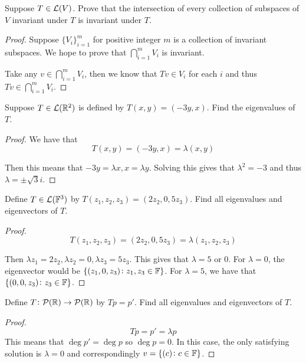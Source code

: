 \documentclass{extarticle}
\begin{document}
\begin{problem}{3}
    Suppose \(T \in \mathcal{L}(V)\). Prove that the intersection of every collection of 
    subspaces of \(V\) invariant under \(T\) is invariant under \(T\).
\end{problem}

\begin{proof}
Suppose \(\{V_i\}_{i=1}^m\) for positive integer \(m\) is a collection of invariant subspaces. 
We hope to prove that \(\bigcap_{i=1}^m V_i\) is invariant. 

Take any \(v \in \bigcap_{i=1}^m V_i\), then we know that \(Tv \in V_i\) for each \(i\)
and thus \(Tv \in \bigcap_{i=1}^m V_i\).
\end{proof}

\begin{problem}{5}
    Suppose \(T \in \mathcal{L}(\mathbb{R}^2)\) is defined by \(T(x, y) = (-3y, x)\). Find the eigenvalues 
    of \(T\).
\end{problem}

\begin{proof}
We have that 
\[T(x, y) = (-3 y, x) = \lambda(x, y)\]

Then this means that \(-3y = \lambda x, x= \lambda y\). Solving this gives that \(\lambda^2 = -3\)
and thus \(\lambda = \pm \sqrt{3}i\). 
\end{proof}

\begin{problem}{7}
    Define \(T \in \mathcal{L}(\mathbb{F}^3)\) by \(T(z_1, z_2, z_3) = (2z_2, 0, 5z_3)\). Find all eigenvalues 
    and eigenvectors of \(T\).
\end{problem}

\begin{proof}
\[T(z_1, z_2, z_3) = (2z_2, 0, 5z_3) = \lambda(z_1, z_2, z_3)\]

Then \(\lambda z_1 = 2z_2, \lambda z_2 = 0, \lambda z_3 = 5 z_3\). This gives that \(\lambda=5 \text{ or } 0\).
For \(\lambda = 0\), the eigenvector would be \(\{(z_1, 0, z_3) \colon z_1, z_3 \in \mathbb{F}\}\). 
For \(\lambda = 5\), we have that \(\{(0, 0, z_3) \colon z_3 \in \mathbb{F}\}\). 
\end{proof}

\begin{problem}{9}
    Define \(T \colon \mathcal{P}(\mathbb{R}) \to \mathcal{P}(\mathbb{R})\) by \(Tp = p'\). Find all eigenvalues and 
    eigenvectors of \(T\).
\end{problem}

\begin{proof}
\[Tp = p' = \lambda p\]
This means that \(\deg p' = \deg p\) so \(\deg p = 0\). In this case, the only satisfying 
solution is \(\lambda = 0\) and correspondingly \(v = \{(c) \colon c \in \mathbb{F}\}\).
\end{proof}
\end{document}
